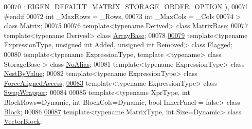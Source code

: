 \begin{DoxyCode}
00070                           : EIGEN\_DEFAULT\_MATRIX\_STORAGE\_ORDER\_OPTION ),
00071 \textcolor{preprocessor}{#endif}
00072          \textcolor{keywordtype}{int} \_MaxRows = \_Rows,
00073          \textcolor{keywordtype}{int} \_MaxCols = \_Cols
00074 > \textcolor{keyword}{class }\hyperlink{group___core___module_class_eigen_1_1_matrix}{Matrix};
00075 
00076 \textcolor{keyword}{template}<\textcolor{keyword}{typename} Derived> \textcolor{keyword}{class }\hyperlink{group___core___module_class_eigen_1_1_matrix_base}{MatrixBase};
00077 \textcolor{keyword}{template}<\textcolor{keyword}{typename} Derived> \textcolor{keyword}{class }\hyperlink{group___core___module_class_eigen_1_1_array_base}{ArrayBase};
00078 
\hyperlink{class_eigen_1_1_flagged}{00079} \textcolor{keyword}{template}<\textcolor{keyword}{typename} ExpressionType, \textcolor{keywordtype}{unsigned} \textcolor{keywordtype}{int} Added, \textcolor{keywordtype}{unsigned} \textcolor{keywordtype}{int} Removed> \textcolor{keyword}{class }
      \hyperlink{class_eigen_1_1_flagged}{Flagged};
00080 \textcolor{keyword}{template}<\textcolor{keyword}{typename} ExpressionType, \textcolor{keyword}{template} <\textcolor{keyword}{typename}> \textcolor{keyword}{class }StorageBase > \textcolor{keyword}{class }
      \hyperlink{group___core___module_class_eigen_1_1_no_alias}{NoAlias};
00081 \textcolor{keyword}{template}<\textcolor{keyword}{typename} ExpressionType> \textcolor{keyword}{class }\hyperlink{group___core___module_class_eigen_1_1_nest_by_value}{NestByValue};
00082 \textcolor{keyword}{template}<\textcolor{keyword}{typename} ExpressionType> \textcolor{keyword}{class }\hyperlink{group___core___module_class_eigen_1_1_force_aligned_access}{ForceAlignedAccess};
\hyperlink{class_eigen_1_1_swap_wrapper}{00083} \textcolor{keyword}{template}<\textcolor{keyword}{typename} ExpressionType> \textcolor{keyword}{class }\hyperlink{class_eigen_1_1_swap_wrapper}{SwapWrapper};
00084 
00085 \textcolor{keyword}{template}<\textcolor{keyword}{typename} XprType, \textcolor{keywordtype}{int} BlockRows=Dynamic, \textcolor{keywordtype}{int} BlockCols=Dynamic, \textcolor{keywordtype}{bool} InnerPanel = false> \textcolor{keyword}{class }
      \hyperlink{group___core___module_class_eigen_1_1_block}{Block};
00086 
\hyperlink{group___core___module}{00087} \textcolor{keyword}{template}<\textcolor{keyword}{typename} MatrixType, \textcolor{keywordtype}{int} Size=Dynamic> \textcolor{keyword}{class }\hyperlink{group___core___module_class_eigen_1_1_vector_block}{VectorBlock};

\end{DoxyCode}
